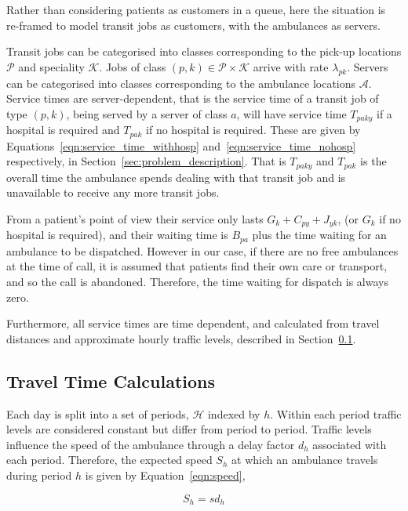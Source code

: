 \documentclass[preprint,12pt]{elsarticle}
\begin{document}
Rather than considering patients as customers in a queue, here the situation
is re-framed to model transit jobs as customers, with the ambulances as
servers.

Transit jobs can be categorised into classes corresponding to the pick-up
locations $\mathcal{P}$ and speciality $\mathcal{K}$. Jobs of class
$(p, k) \in \mathcal{P} \times \mathcal{K}$ arrive with rate $\lambda_{pk}$.
Servers can be categorised into classes corresponding to the ambulance
locations $\mathcal{A}$. Service times are server-dependent, that is the
service time of a transit job of type $(p, k)$, being served by a server of
class $a$, will have service time $T_{paky}$ if a hospital is required and
$T_{pak}$ if no hospital is required. These are given by
Equations~\ref{eqn:service_time_withhosp} and~\ref{eqn:service_time_nohosp}
respectively, in Section~\ref{sec:problem_description}.
That is $T_{paky}$ and $T_{pak}$ is the overall time the ambulance spends
dealing with that transit job and is unavailable to receive any more transit
jobs.

From a patient's point of view their service only lasts $G_k + C_{py} + J_{yk}$,
(or $G_k$ if no hospital is required), and their waiting time is $B_{pa}$ plus
the time waiting for an ambulance to be dispatched. However in our case, if
there are no free ambulances at the time of call, it is assumed that patients
find their own care or transport, and so the call is abandoned. Therefore, the
time waiting for dispatch is always zero.

Furthermore, all service times are time dependent, and calculated from travel
distances and approximate hourly traffic levels, described in
Section~\ref{sec:travel_times}.

\subsection{Travel Time Calculations}\label{sec:travel_times}
Each day is split into a set of periods, $\mathcal{H}$ indexed by $h$. Within
each period traffic levels are considered constant but differ from period to
period. Traffic levels influence the speed of the ambulance through a delay
factor $d_h$ associated with each period. Therefore, the expected speed $S_h$
at which an ambulance travels during period $h$ is given by
Equation~\ref{eqn:speed},

\begin{equation}\label{eqn:speed}
S_h = s d_h
\end{equation}
\end{document}
